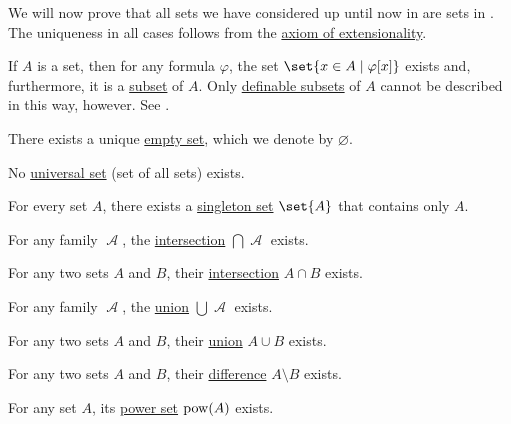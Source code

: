 \begin{proposition}\label{thm:zfc_existence_theorems}
  We will now prove that all sets we have considered up until now in  are sets in \hyperref[def:zfc]{}. The uniqueness in all cases follows from the \hyperref[def:zfc/extensionality]{axiom of extensionality}.

  \begin{thmenum}
     If \( A \) is a set, then for any formula \( \varphi \), the set \( \set{ x \in A \given \varphi[x] } \) exists and, furthermore, it is a \hyperref[def:subset]{subset} of \( A \). Only \hyperref[def:first_order_definability]{definable subsets} of \( A \) cannot be described in this way, however. See .

     There exists a unique \hyperref[def:empty_set]{empty set}, which we denote by \( \varnothing \).

     No \hyperref[def:set]{universal set} (set of all sets) exists.

     For every set \( A \), there exists a \hyperref[rem:singleton_sets]{singleton set} \( \set{ A } \) that contains only \( A \).

     For any  family \( \mscrA \), the \hyperref[def:basic_set_operations/intersection]{intersection} \( \bigcap \mscrA \) exists.

     For any two sets \( A \) and \( B \), their \hyperref[def:basic_set_operations/intersection]{intersection} \( A \cap B \) exists.

     For any family \( \mscrA \), the \hyperref[def:basic_set_operations/union]{union} \( \bigcup \mscrA \) exists.

     For any two sets \( A \) and \( B \), their \hyperref[def:basic_set_operations/union]{union} \( A \cup B \) exists.

     For any two sets \( A \) and \( B \), their \hyperref[def:basic_set_operations/difference]{difference} \( A \setminus B \) exists.

     For any set \( A \), its \hyperref[def:basic_set_operations/power_set]{power set} \( \operatorname{pow}(A) \) exists.


\end{thmenum}
\end{proposition}
